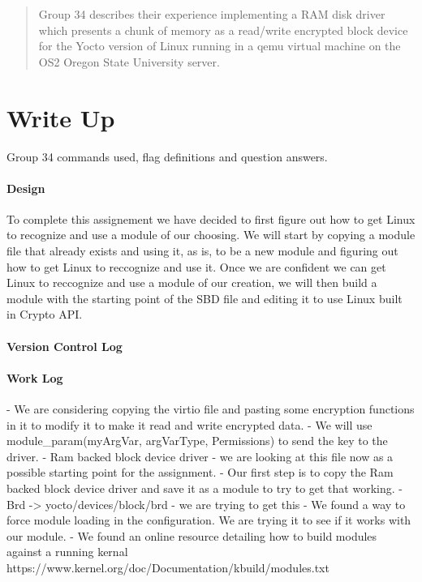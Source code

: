 \documentclass[titlepage,draftclsnofoot,onecolumn]{article}
\begin{document}
\maketitle

\begin{abstract}
  Group 34 describes their experience implementing a RAM disk driver which presents a chunk of memory as a read/write encrypted block device for the Yocto version of Linux running in a qemu virtual machine on the OS2 Oregon State University server.
\end{abstract}

\section*{Write Up}
Group 34 commands used, flag definitions and question answers.

\paragraph{Design}
To complete this assignement we have decided to first figure out how to get Linux to recognize and use a module of our choosing. We will start by copying a module file that already exists and using it, as is, to be a new module and figuring out how to get Linux to reccognize and use it. Once we are confident we can get Linux to reccognize and use a module of our creation, we will then build a module with the starting point of the SBD file and editing it to use Linux built in Crypto API.

\paragraph{Version Control Log}

\paragraph{Work Log}
- We are considering copying the virtio file and pasting some encryption functions in it to modify it to make it read and write encrypted data.
- We will use module_param(myArgVar, argVarType, Permissions) to send the key to the driver.
- Ram backed block device driver - we are looking at this file now as a possible starting point for the assignment.
- Our first step is to copy the Ram backed block device driver and save it as a module to try to get that working.
- Brd -> yocto/devices/block/brd - we are trying to get this
- We found a way to force module loading in the configuration. We are trying it to see if it works with our module.
- We found an online resource detailing how to build modules against a running kernal https://www.kernel.org/doc/Documentation/kbuild/modules.txt
\end{document}
